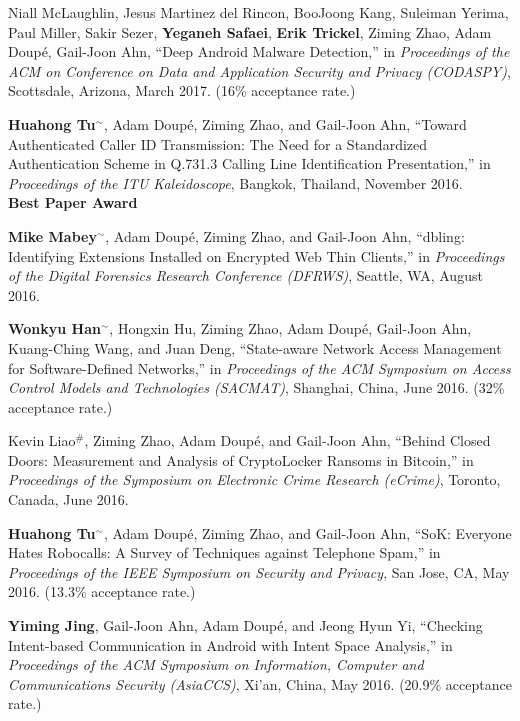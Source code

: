 \documentclass[11pt,letterpaper,sans]{moderncv}
\begin{document}
\begin{etaremune}
\item Niall McLaughlin, Jesus Martinez del Rincon, BooJoong Kang,
  Suleiman Yerima, Paul Miller, Sakir Sezer, \textbf{Yeganeh
    Safaei}, \textbf{Erik Trickel}, Ziming Zhao, Adam
    Doup\'e, Gail-Joon Ahn, ``Deep Android Malware Detection,'' in
  \emph{Proceedings of the ACM on Conference on Data and Application
    Security and Privacy (CODASPY)}, Scottsdale, Arizona, March 2017. (16\% acceptance rate.)

\item \textbf{Huahong Tu}$^{\sim}$, Adam Doup\'e, Ziming Zhao, and
  Gail-Joon Ahn, ``Toward Authenticated Caller ID Transmission: The
  Need for a Standardized Authentication Scheme in Q.731.3 Calling
  Line Identification Presentation,'' in \emph{Proceedings of the ITU
    Kaleidoscope}, Bangkok, Thailand, November 2016. \\
  \textbf{Best Paper Award}

\item \textbf{Mike Mabey}$^{\sim}$, Adam Doup\'e, Ziming Zhao, and
  Gail-Joon Ahn, ``dbling: Identifying Extensions Installed on
  Encrypted Web Thin Clients,'' in \emph{Proceedings of the Digital
    Forensics Research Conference (DFRWS)}, Seattle, WA, August 2016.

\item \textbf{Wonkyu Han}$^{\sim}$, Hongxin Hu, Ziming Zhao, Adam
  Doup\'e, Gail-Joon Ahn, Kuang-Ching Wang, and Juan Deng,
  ``State-aware Network Access Management for Software-Defined
  Networks,'' in \emph{Proceedings of the ACM Symposium on Access
    Control Models and Technologies (SACMAT)}, Shanghai, China, June
  2016. (32\% acceptance rate.)

\item Kevin Liao$^{\#}$, Ziming Zhao, Adam Doup\'e,
  and Gail-Joon Ahn, ``Behind Closed Doors: Measurement and Analysis
  of CryptoLocker Ransoms in Bitcoin,'' in \emph{Proceedings of the
    Symposium on Electronic Crime Research (eCrime)}, Toronto, Canada,
  June 2016.

\item \textbf{Huahong Tu}$^{\sim}$, Adam Doup\'e, Ziming Zhao, and
  Gail-Joon Ahn, ``SoK: Everyone Hates Robocalls: A Survey of
  Techniques against Telephone Spam,'' in \emph{Proceedings of the
    IEEE Symposium on Security and Privacy}, San Jose, CA, May 2016.
  (13.3\% acceptance rate.)

\item \textbf{Yiming Jing}, Gail-Joon Ahn, Adam Doup\'e,
  and Jeong Hyun Yi, ``Checking Intent-based Communication in Android
  with Intent Space Analysis,'' in \emph{Proceedings of the ACM
    Symposium on Information, Computer and Communications Security
  (AsiaCCS)}, Xi’an, China, May 2016. (20.9\% acceptance
  rate.)


\end{etaremune}
\end{document}

